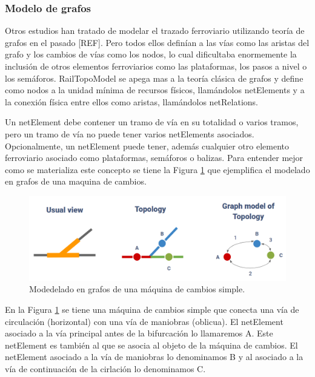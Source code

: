 \subsubsection{Modelo de grafos}
    \label{sec:RTM}
    
    Otros estudios han tratado de modelar el trazado ferroviario utilizando teoría de grafos en el pasado [REF]. Pero todos ellos definían a las vías como las aristas del grafo y los cambios de vías como los nodos, lo cual dificultaba enormemente la inclusión de otros elementos ferroviarios como las plataformas, los pasos a nivel o los semáforos. RailTopoModel se apega mas a la teoría clásica de grafos y define como nodos a la unidad mínima de recursos físicos, llamándolos netElements y a la conexión física entre ellos como aristas, llamándolos netRelations.

    Un netElement debe contener un tramo de vía en su totalidad o varios tramos, pero un tramo de vía no puede tener varios netElements asociados. Opcionalmente, un netElement puede tener, además cualquier otro elemento ferroviario asociado como plataformas, semáforos o balizas. Para entender mejor como se materializa este concepto se tiene la Figura \ref{fig:grafos_1} que ejemplifica el modelado en grafos de una maquina de cambios.

    \begin{figure}[!h]
        \centering
        \includegraphics[width=1\textwidth]{Figuras/grafos}
        \centering\caption{Modedelado en grafos de una máquina de cambios simple.}
        \label{fig:grafos_1}
    \end{figure}

    En la Figura \ref{fig:grafos_1} se tiene una máquina de cambios simple que conecta una vía de circulación (horizontal) con una vía de maniobras (oblicua). El netElement asociado a la vía principal antes de la bifurcación lo llamaremos A. Este netElement es también al que se asocia al objeto de la máquina de cambios. El netElement asociado a la vía de maniobras lo denominamos B y al asociado a la vía de continuación de la cirlación lo denominamos C.

